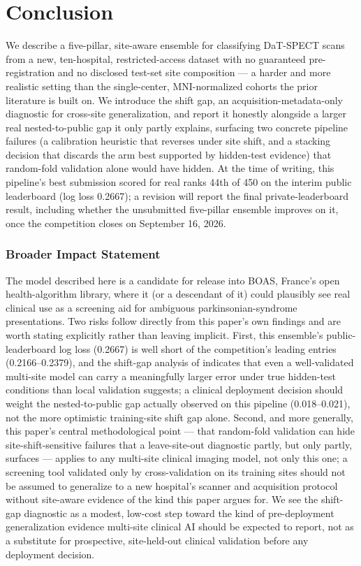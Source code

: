 \documentclass[10pt]{article}
\begin{document}
\section{Conclusion}
\label{sec:conclusion}

We describe a five-pillar, site-aware ensemble for classifying DaT-SPECT scans from a new, ten-hospital, restricted-access dataset with no guaranteed pre-registration and no disclosed test-set site composition --- a harder and more realistic setting than the single-center, MNI-normalized cohorts the prior literature is built on. We introduce the shift gap, an acquisition-metadata-only diagnostic for cross-site generalization, and report it honestly alongside a larger real nested-to-public gap it only partly explains, surfacing two concrete pipeline failures (a calibration heuristic that reverses under site shift, and a stacking decision that discards the arm best supported by hidden-test evidence) that random-fold validation alone would have hidden. At the time of writing, this pipeline's best submission scored for real ranks 44th of 450 on the interim public leaderboard (log loss 0.2667); a revision will report the final private-leaderboard result, including whether the unsubmitted five-pillar ensemble improves on it, once the competition closes on September 16, 2026.

\subsubsection*{Broader Impact Statement}

The model described here is a candidate for release into BOAS, France's open health-algorithm library, where it (or a descendant of it) could plausibly see real clinical use as a screening aid for ambiguous parkinsonian-syndrome presentations. Two risks follow directly from this paper's own findings and are worth stating explicitly rather than leaving implicit. First, this ensemble's public-leaderboard log loss (0.2667) is well short of the competition's leading entries (0.2166--0.2379), and the shift-gap analysis of  indicates that even a well-validated multi-site model can carry a meaningfully larger error under true hidden-test conditions than local validation suggests; a clinical deployment decision should weight the nested-to-public gap actually observed on this pipeline (0.018--0.021), not the more optimistic training-site shift gap alone. Second, and more generally, this paper's central methodological point --- that random-fold validation can hide site-shift-sensitive failures that a leave-site-out diagnostic partly, but only partly, surfaces --- applies to any multi-site clinical imaging model, not only this one; a screening tool validated only by cross-validation on its training sites should not be assumed to generalize to a new hospital's scanner and acquisition protocol without site-aware evidence of the kind this paper argues for. We see the shift-gap diagnostic as a modest, low-cost step toward the kind of pre-deployment generalization evidence multi-site clinical AI should be expected to report, not as a substitute for prospective, site-held-out clinical validation before any deployment decision.
\end{document}

